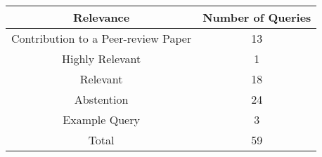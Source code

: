 \begin{center}
    \begin{tabular}{|c|c|}
        \hline
        Relevance & Number of Queries \\
        \hline\hline
        Contribution to a Peer-review Paper & 13 \\
        \hline
        Highly Relevant                     & 1 \\
        \hline
        Relevant                            & 18 \\
        \hline
        Abstention                          & 24 \\
        \hline
        Example Query                       & 3 \\
        \hline\hline
        Total                               & 59 \\
        \hline
    \end{tabular}
\end{center}
    
